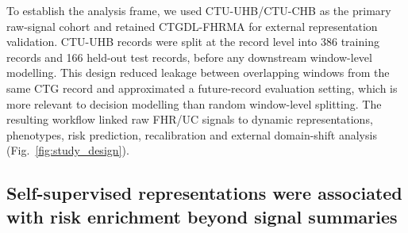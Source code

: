 \documentclass[pdflatex,sn-nature]{sn-jnl}
\begin{document}
To establish the analysis frame, we used CTU-UHB/CTU-CHB as the primary raw-signal cohort and retained CTGDL-FHRMA for external representation validation. CTU-UHB records were split at the record level into 386 training records and 166 held-out test records, before any downstream window-level modelling. This design reduced leakage between overlapping windows from the same CTG record and approximated a future-record evaluation setting, which is more relevant to decision modelling than random window-level splitting. The resulting workflow linked raw FHR/UC signals to dynamic representations, phenotypes, risk prediction, recalibration and external domain-shift analysis (Fig.~\ref{fig:study_design}).

\subsection{Self-supervised representations were associated with risk enrichment beyond signal summaries}
\end{document}
